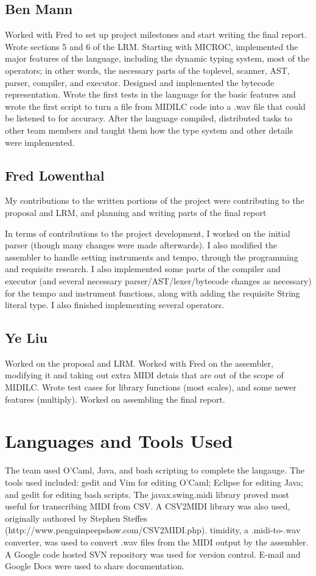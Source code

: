 \documentclass[12pt,A4]{book}
\begin{document}
\subsection{Ben Mann}
Worked with Fred to set up project milestones and start writing the final report.  Wrote sections 5 and 6 of the LRM.  Starting with MICROC, implemented the major features of the language, including the dynamic typing system, most of the operators; in other words, the necessary parts of the toplevel, scanner, AST, parser, compiler, and executor.  Designed and implemented the bytecode representation.  Wrote the first tests in the language for the basic features and wrote the first script to turn a file from MIDILC code into a .wav file that could be listened to for accuracy.  After the language compiled, distributed tasks to other team members and taught them how the type system and other details were implemented.

\subsection{Fred Lowenthal}
My contributions to the written portions of the project were contributing to the proposal and LRM, and planning and writing parts of the final report 

In terms of contributions to the project development, I worked on the initial parser (though many changes were made afterwards).  I also modified the assembler to handle setting instruments and tempo, through the programming and requisite research.  I also implemented some parts of the compiler and executor (and several necessary parser/AST/lexer/bytecode changes as necessary) for the tempo and instrument functions, along with adding the requisite String literal type.  I also finished implementing several operators.
\subsection{Ye Liu}
Worked on the proposal and LRM. Worked with Fred on the assembler, modifying it and taking out extra MIDI detais that are out of the scope of MIDILC. Wrote test cases for library functions (most scales), and some newer features (multiply). Worked on assembling the final report.

\section{Languages and Tools Used}
The team used O'Caml, Java, and bash scripting to complete the langauge. The tools used included: gedit and Vim for editing O'Caml; Eclipse for editing Java; and gedit for editing bash scripts. The javax.swing.midi library proved most useful for transcribing MIDI from CSV. A CSV2MIDI library was also used, originally authored by Stephen Steffes (http://www.penguinpeepshow.com/CSV2MIDI.php). timidity, a .midi-to-.wav converter, was used to convert .wav files from the MIDI output by the assembler. A Google code hosted SVN repository was used for version control. E-mail and Google Docs were used to share documentation.
\end{document}
